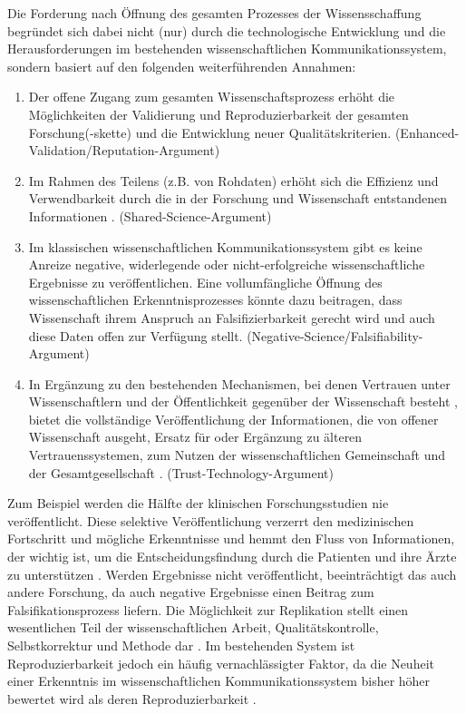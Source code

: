 Die Forderung nach Öffnung des gesamten Prozesses der Wissensschaffung begründet sich dabei nicht (nur) durch die technologische Entwicklung und die Herausforderungen im bestehenden wissenschaftlichen Kommunikationssystem, sondern basiert auf den folgenden weiterführenden Annahmen:
\begin{enumerate}
\item Der offene Zugang zum gesamten Wissenschaftsprozess erhöht die Möglichkeiten der Validierung und Reproduzierbarkeit der gesamten Forschung(-skette) \cite{Nosek_2015} \cite{Aleksic_2014} \cite{Krumholz_2014} \cite{hey_2015_open} und die Entwicklung neuer Qualitätskriterien. (Enhanced-Validation/Reputation-Argument)
\item Im Rahmen des Teilens (z.B. von Rohdaten) erhöht sich die Effizienz und Verwendbarkeit durch die in der Forschung und Wissenschaft entstandenen Informationen \cite{Fecher_2015}. (Shared-Science-Argument)
\item Im klassischen wissenschaftlichen Kommunikationssystem gibt es keine Anreize negative, widerlegende oder nicht-erfolgreiche wissenschaftliche Ergebnisse zu veröffentlichen. Eine vollumfängliche Öffnung des wissenschaftlichen Erkenntnisprozesses könnte dazu beitragen, dass Wissenschaft ihrem Anspruch an Falsifizierbarkeit gerecht wird und auch diese Daten offen zur Verfügung stellt. (Negative-Science/Falsifiability-Argument)
\item In Ergänzung zu den bestehenden Mechanismen, bei denen Vertrauen unter Wissenschaftlern und der Öffentlichkeit gegenüber der Wissenschaft besteht \cite{weingart_2005_wissenschaft}, bietet die vollständige Veröffentlichung der Informationen, die von offener Wissenschaft ausgeht, Ersatz für oder Ergänzung zu älteren Vertrauenssystemen, zum Nutzen der wissenschaftlichen Gemeinschaft und der Gesamtgesellschaft \cite{grand_2012_open}. (Trust-Technology-Argument)
\end{enumerate}

Zum Beispiel werden die Hälfte der klinischen Forschungsstudien nie veröffentlicht. Diese selektive Veröffentlichung verzerrt den medizinischen Fortschritt und mögliche Erkenntnisse und hemmt den Fluss von Informationen, der wichtig ist, um die Entscheidungsfindung durch die Patienten und ihre Ärzte zu unterstützen \cite{Ross_2013}. Werden Ergebnisse nicht veröffentlicht, beeinträchtigt das auch andere Forschung, da auch negative Ergebnisse einen Beitrag zum Falsifikationsprozess liefern. Die Möglichkeit zur Replikation stellt einen wesentlichen Teil der wissenschaftlichen Arbeit, Qualitätskontrolle, Selbstkorrektur und Methode dar \cite{Nosek_2015}. Im bestehenden System ist Reproduzierbarkeit jedoch ein häufig vernachlässigter Faktor, da die Neuheit einer Erkenntnis im wissenschaftlichen Kommunikationssystem bisher höher bewertet wird als deren Reproduzierbarkeit \cite{Nosek_2015}.

